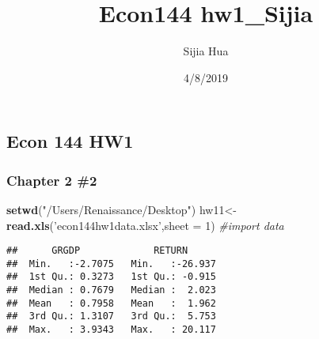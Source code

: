 \documentclass[]{article}
\title{Econ144 hw1\_Sijia}
\author{Sijia Hua}
\date{4/8/2019}
\newenvironment{Shaded}{\begin{snugshade}}{\end{snugshade}}
\newcommand{\KeywordTok}[1]{\textcolor[rgb]{0.13,0.29,0.53}{\textbf{#1}}}
\newcommand{\DataTypeTok}[1]{\textcolor[rgb]{0.13,0.29,0.53}{#1}}
\newcommand{\DecValTok}[1]{\textcolor[rgb]{0.00,0.00,0.81}{#1}}
\newcommand{\StringTok}[1]{\textcolor[rgb]{0.31,0.60,0.02}{#1}}
\newcommand{\CommentTok}[1]{\textcolor[rgb]{0.56,0.35,0.01}{\textit{#1}}}
\newcommand{\OperatorTok}[1]{\textcolor[rgb]{0.81,0.36,0.00}{\textbf{#1}}}
\newcommand{\NormalTok}[1]{#1}
\begin{document}
\maketitle

\subsection{Econ 144 HW1}\label{econ-144-hw1}

\subsubsection{Chapter 2 \#2}\label{chapter-2-2}

\begin{Shaded}
\begin{Highlighting}[]
\KeywordTok{setwd}\NormalTok{(}\StringTok{"/Users/Renaissance/Desktop"}\NormalTok{)}
\NormalTok{hw11<-}\KeywordTok{read.xls}\NormalTok{(}\StringTok{'econ144hw1data.xlsx'}\NormalTok{,}\DataTypeTok{sheet =} \DecValTok{1}\NormalTok{) }\CommentTok{#import data}
\end{Highlighting}
\end{Shaded}

\begin{Shaded}
\end{Shaded}

\begin{verbatim}
##      GRGDP             RETURN       
##  Min.   :-2.7075   Min.   :-26.937  
##  1st Qu.: 0.3273   1st Qu.: -0.915  
##  Median : 0.7679   Median :  2.023  
##  Mean   : 0.7958   Mean   :  1.962  
##  3rd Qu.: 1.3107   3rd Qu.:  5.753  
##  Max.   : 3.9343   Max.   : 20.117
\end{verbatim}

\begin{Shaded}
\end{Shaded}
\end{document}
